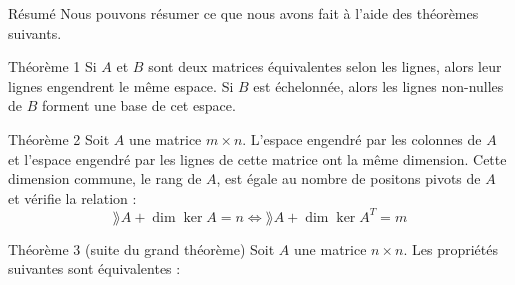 \documentclass[a4paper]{article}
\begin{document}
\begin{parag}{Résumé}
    Nous pouvons résumer ce que nous avons fait à l'aide des théorèmes suivants.

    \begin{subparag}{Théorème 1}
        Si $A$ et $B$ sont deux matrices équivalentes selon les lignes, alors leur lignes engendrent le même espace. Si $B$ est échelonnée, alors les lignes non-nulles de $B$ forment une base de cet espace.
    \end{subparag}

    \begin{subparag}{Théorème 2}
        Soit $A$ une matrice $m \times n$. L'espace engendré par les colonnes de $A$ et l'espace engendré par les lignes de cette matrice ont la même dimension. Cette dimension commune, le rang de $A$, est égale au nombre de positons pivots de $A$ et vérifie la relation :
        \[\rang A + \dim\ker A = n \iff \rang A + \dim\ker A^T = m\]

    \end{subparag}

    \begin{subparag}{Théorème 3 (suite du grand théorème)}
        Soit $A$ une matrice $n \times n$. Les propriétés suivantes sont équivalentes :


\end{subparag}
\end{parag}
\end{document}
